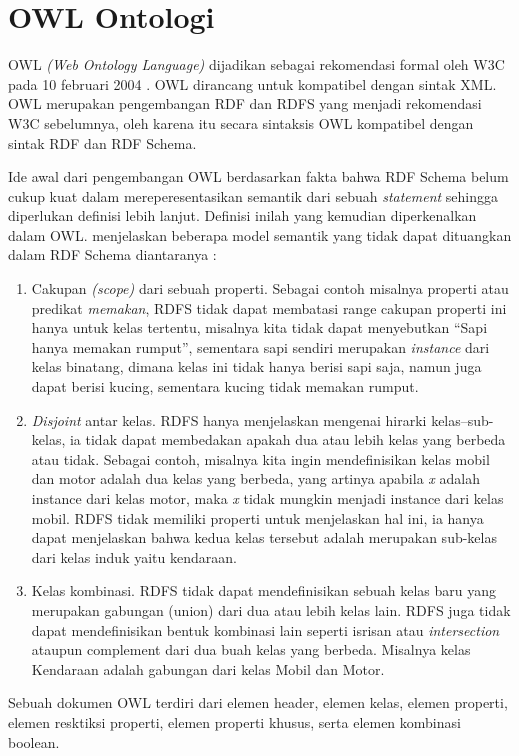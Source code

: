 \section{OWL Ontologi}
OWL \emph{(Web Ontology Language)} dijadikan sebagai rekomendasi formal oleh W3C pada 10 februari 2004 \citep{liyang_yu}. OWL dirancang untuk kompatibel dengan sintak XML. OWL merupakan pengembangan RDF dan RDFS yang menjadi rekomendasi W3C sebelumnya, oleh karena itu secara sintaksis OWL kompatibel dengan sintak RDF dan RDF Schema.

Ide awal dari pengembangan OWL berdasarkan fakta bahwa RDF Schema belum cukup kuat dalam mereperesentasikan semantik dari sebuah \emph{statement} sehingga diperlukan definisi lebih lanjut. Definisi inilah yang kemudian diperkenalkan dalam OWL. \citet*{antoniou} menjelaskan beberapa model semantik yang tidak dapat dituangkan dalam RDF Schema diantaranya :
\begin{enumerate}
	\item Cakupan \emph{(scope)} dari sebuah properti. Sebagai contoh misalnya properti atau predikat \textit{memakan}, RDFS tidak dapat membatasi range cakupan properti ini hanya untuk kelas tertentu, misalnya kita tidak dapat menyebutkan ``Sapi hanya memakan rumput'', sementara sapi sendiri merupakan \emph{instance} dari kelas binatang, dimana kelas ini tidak hanya berisi sapi saja, namun juga dapat berisi kucing, sementara kucing tidak memakan rumput.
	\item \emph{Disjoint} antar kelas. RDFS hanya menjelaskan mengenai hirarki kelas--sub-kelas, ia tidak dapat membedakan apakah dua atau lebih kelas yang berbeda atau tidak. Sebagai contoh, misalnya kita ingin mendefinisikan kelas mobil dan motor adalah dua kelas yang berbeda, yang artinya apabila \emph{x} adalah instance dari kelas motor, maka \emph{x} tidak mungkin menjadi instance dari kelas mobil. RDFS tidak memiliki properti untuk menjelaskan hal ini, ia hanya dapat menjelaskan bahwa kedua kelas tersebut adalah merupakan sub-kelas dari kelas induk yaitu kendaraan.
	\item Kelas kombinasi. RDFS tidak dapat mendefinisikan sebuah kelas baru yang merupakan gabungan (union) dari dua atau lebih kelas lain. RDFS juga tidak dapat mendefinisikan bentuk kombinasi lain seperti isrisan atau \emph{intersection} ataupun complement dari dua buah kelas yang berbeda. Misalnya kelas Kendaraan adalah gabungan dari kelas Mobil dan Motor.
\end{enumerate}
Sebuah dokumen OWL terdiri dari elemen header, elemen kelas, elemen properti, elemen resktiksi properti, elemen properti khusus, serta elemen kombinasi boolean. 

